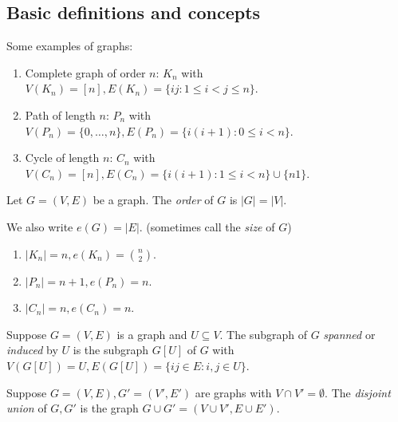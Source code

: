 \documentclass[a4paper]{article}
\begin{document}
\subsection{Basic definitions and concepts}

\begin{eg}
  Some examples of graphs:
  \begin{enumerate}
  \item Complete graph of order \(n\): \(K_n\) with \(V(K_n) = [n], E(K_n) = \{ij: 1 \leq i < j \leq n\}\).
  \item Path of length \(n\): \(P_n\) with \(V(P_n) = \{0, \dots, n\}, E(P_n) = \{i(i + 1): 0 \leq i < n\}\).
  \item Cycle of length \(n\): \(C_n\) with \(V(C_n) = [n], E(C_n) = \{i(i + 1): 1 \leq i < n\} \cup \{n1\}\).
  \end{enumerate}
\end{eg}

\begin{definition}[order]
  Let \(G = (V, E)\) be a graph. The \emph{order} of \(G\) is \(|G| = |V|\).

  We also write \(e(G) = |E|\). (sometimes call the \emph{size} of \(G\))
\end{definition}

\begin{eg}\leavevmode
  \begin{enumerate}
  \item \(|K_n| = n, e(K_n) = \binom{n}{2}\).
  \item \(|P_n| = n + 1, e(P_n) = n\).
  \item \(|C_n| = n, e(C_n) = n\).
  \end{enumerate}
\end{eg}

\begin{definition}
  Suppose \(G = (V, E)\) is a graph and \(U \subseteq V\). The subgraph of \(G\) \emph{spanned} or \emph{induced} by \(U\) is the subgraph \(G[U]\) of \(G\) with \(V(G[U]) = U, E(G[U]) = \{ij \in E: i, j \in U\}\).
\end{definition}

\begin{definition}
  Suppose \(G = (V, E), G' = (V', E')\) are graphs with \(V \cap V' = \emptyset\). The \emph{disjoint union} of \(G, G'\) is the graph \(G \cup G' = (V \cup V', E \cup E')\).
\end{definition}
\end{document}
